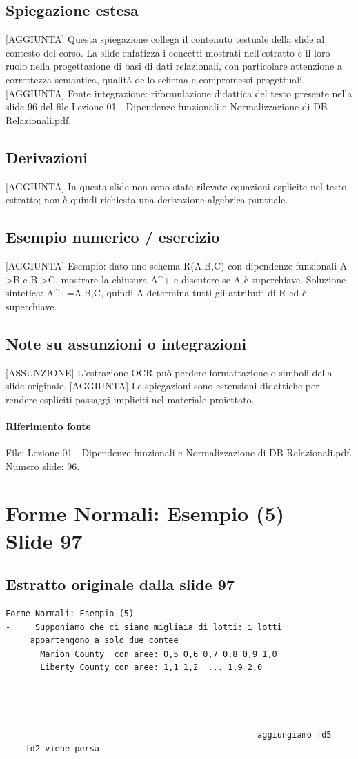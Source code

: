 \documentclass[11pt]{article}
\begin{document}
\subsection*{Spiegazione estesa}
[AGGIUNTA] Questa spiegazione collega il contenuto testuale della slide al contesto del corso. La slide enfatizza i concetti mostrati nell'estratto e il loro ruolo nella progettazione di basi di dati relazionali, con particolare attenzione a correttezza semantica, qualità dello schema e compromessi progettuali.
[AGGIUNTA] Fonte integrazione: riformulazione didattica del testo presente nella slide 96 del file Lezione 01 - Dipendenze funzionali e Normalizzazione di DB Relazionali.pdf.
\subsection*{Derivazioni}
[AGGIUNTA] In questa slide non sono state rilevate equazioni esplicite nel testo estratto; non è quindi richiesta una derivazione algebrica puntuale.
\subsection*{Esempio numerico / esercizio}
[AGGIUNTA] Esempio: dato uno schema R(A,B,C) con dipendenze funzionali A->B e B->C, mostrare la chiusura A^+ e discutere se A è superchiave. Soluzione sintetica: A^+={A,B,C}, quindi A determina tutti gli attributi di R ed è superchiave.
\subsection*{Note su assunzioni o integrazioni}
[ASSUNZIONE] L'estrazione OCR può perdere formattazione o simboli della slide originale.
[AGGIUNTA] Le spiegazioni sono estensioni didattiche per rendere espliciti passaggi impliciti nel materiale proiettato.
\paragraph{Riferimento fonte} File: Lezione 01 - Dipendenze funzionali e Normalizzazione di DB Relazionali.pdf. Numero slide: 96.
\section{Forme Normali: Esempio (5) --- Slide 97}
\subsection*{Estratto originale dalla slide 97}
\begin{lstlisting}
Forme Normali: Esempio (5)
-     Supponiamo che ci siano migliaia di lotti: i lotti
     appartengono a solo due contee
       Marion County  con aree: 0,5 0,6 0,7 0,8 0,9 1,0
       Liberty County con aree: 1,1 1,2  ... 1,9 2,0




                                                   aggiungiamo fd5
    fd2 viene persa
\end{lstlisting}
\end{document}
